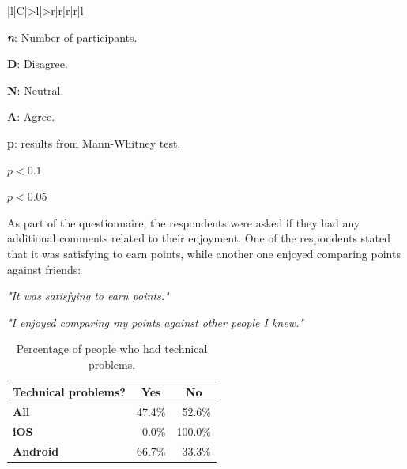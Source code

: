 \begin{table}[H]
\begin{threeparttable}[t]
\begin{tabularx}{\textwidth}{|l|C|>{\scriptsize}l|>{\scriptsize}r|r|r|r|l|}
\end{tabularx}
\begin{tablenotes}
    \scriptsize
     \item[] \textbf{\textit{n}}: Number of participants.
     \item[] \textbf{D}: Disagree.
     \item[] \textbf{N}: Neutral.
     \item[] \textbf{A}: Agree.
     \item[] \textbf{p}: results from Mann-Whitney test.\\
     \item[*] $p < 0.1$ 
     \item[**] $p < 0.05$ 
   \end{tablenotes}
   \end{threeparttable}
\caption[Noticeable differences in enjoyment for the two sample groups.]{Noticeable differences in enjoyment for the two sample groups. Full table in Appendix \ref{appendix:statistics}.}
\label{tab:statement_significant_enjoyment}
\vspace*{-0.5\baselineskip}
\end{table}

As part of the questionnaire, the respondents were asked if they had any additional comments related to their enjoyment. One of the respondents stated that it was satisfying to earn points, while another one enjoyed comparing points against friends:

\textit{"It was satisfying to earn points." \footnotemark[\value{footnote}]}

\textit{"I enjoyed comparing my points against other people I knew." \footnotemark[\value{footnote}]}


\begin{table}[H]
    \vspace*{0.5\baselineskip}
    \centering
    \begin{tabularx}{0.6\textwidth}{|X|r|r|}
        \hline
        \multicolumn{1}{|c|}{\textbf{Technical problems?}} & \multicolumn{1}{c|}{\textbf{Yes}} & \multicolumn{1}{c|}{\textbf{No}} \\ \hline
        \textbf{All} & 47.4\% & 52.6\% \\ \hline
        \textbf{iOS} & 0.0\% & 100.0\% \\ \hline
        \textbf{Android} & 66.7\% & 33.3\% \\ \hline
    \end{tabularx}
    \caption{Percentage of people who had technical problems.}
    \label{tab:technical_problems}
    \vspace*{-0.5\baselineskip}
\end{table}

